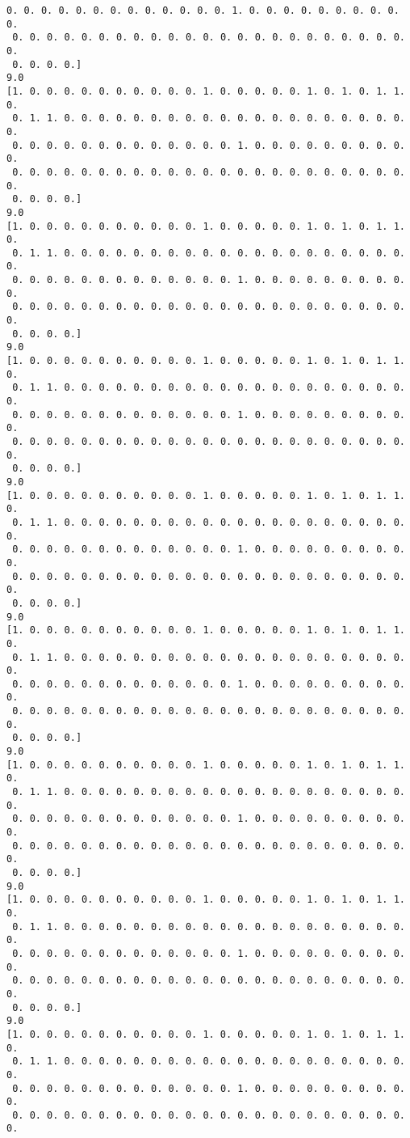 \documentclass[11pt]{article}
\begin{document}
\begin{Verbatim}[commandchars=\\\{\}]
 0. 0. 0. 0. 0. 0. 0. 0. 0. 0. 0. 0. 0. 1. 0. 0. 0. 0. 0. 0. 0. 0. 0. 0.
 0. 0. 0. 0. 0. 0. 0. 0. 0. 0. 0. 0. 0. 0. 0. 0. 0. 0. 0. 0. 0. 0. 0. 0.
 0. 0. 0. 0.]
9.0
[1. 0. 0. 0. 0. 0. 0. 0. 0. 0. 0. 1. 0. 0. 0. 0. 0. 1. 0. 1. 0. 1. 1. 0.
 0. 1. 1. 0. 0. 0. 0. 0. 0. 0. 0. 0. 0. 0. 0. 0. 0. 0. 0. 0. 0. 0. 0. 0.
 0. 0. 0. 0. 0. 0. 0. 0. 0. 0. 0. 0. 0. 1. 0. 0. 0. 0. 0. 0. 0. 0. 0. 0.
 0. 0. 0. 0. 0. 0. 0. 0. 0. 0. 0. 0. 0. 0. 0. 0. 0. 0. 0. 0. 0. 0. 0. 0.
 0. 0. 0. 0.]
9.0
[1. 0. 0. 0. 0. 0. 0. 0. 0. 0. 0. 1. 0. 0. 0. 0. 0. 1. 0. 1. 0. 1. 1. 0.
 0. 1. 1. 0. 0. 0. 0. 0. 0. 0. 0. 0. 0. 0. 0. 0. 0. 0. 0. 0. 0. 0. 0. 0.
 0. 0. 0. 0. 0. 0. 0. 0. 0. 0. 0. 0. 0. 1. 0. 0. 0. 0. 0. 0. 0. 0. 0. 0.
 0. 0. 0. 0. 0. 0. 0. 0. 0. 0. 0. 0. 0. 0. 0. 0. 0. 0. 0. 0. 0. 0. 0. 0.
 0. 0. 0. 0.]
9.0
[1. 0. 0. 0. 0. 0. 0. 0. 0. 0. 0. 1. 0. 0. 0. 0. 0. 1. 0. 1. 0. 1. 1. 0.
 0. 1. 1. 0. 0. 0. 0. 0. 0. 0. 0. 0. 0. 0. 0. 0. 0. 0. 0. 0. 0. 0. 0. 0.
 0. 0. 0. 0. 0. 0. 0. 0. 0. 0. 0. 0. 0. 1. 0. 0. 0. 0. 0. 0. 0. 0. 0. 0.
 0. 0. 0. 0. 0. 0. 0. 0. 0. 0. 0. 0. 0. 0. 0. 0. 0. 0. 0. 0. 0. 0. 0. 0.
 0. 0. 0. 0.]
9.0
[1. 0. 0. 0. 0. 0. 0. 0. 0. 0. 0. 1. 0. 0. 0. 0. 0. 1. 0. 1. 0. 1. 1. 0.
 0. 1. 1. 0. 0. 0. 0. 0. 0. 0. 0. 0. 0. 0. 0. 0. 0. 0. 0. 0. 0. 0. 0. 0.
 0. 0. 0. 0. 0. 0. 0. 0. 0. 0. 0. 0. 0. 1. 0. 0. 0. 0. 0. 0. 0. 0. 0. 0.
 0. 0. 0. 0. 0. 0. 0. 0. 0. 0. 0. 0. 0. 0. 0. 0. 0. 0. 0. 0. 0. 0. 0. 0.
 0. 0. 0. 0.]
9.0
[1. 0. 0. 0. 0. 0. 0. 0. 0. 0. 0. 1. 0. 0. 0. 0. 0. 1. 0. 1. 0. 1. 1. 0.
 0. 1. 1. 0. 0. 0. 0. 0. 0. 0. 0. 0. 0. 0. 0. 0. 0. 0. 0. 0. 0. 0. 0. 0.
 0. 0. 0. 0. 0. 0. 0. 0. 0. 0. 0. 0. 0. 1. 0. 0. 0. 0. 0. 0. 0. 0. 0. 0.
 0. 0. 0. 0. 0. 0. 0. 0. 0. 0. 0. 0. 0. 0. 0. 0. 0. 0. 0. 0. 0. 0. 0. 0.
 0. 0. 0. 0.]
9.0
[1. 0. 0. 0. 0. 0. 0. 0. 0. 0. 0. 1. 0. 0. 0. 0. 0. 1. 0. 1. 0. 1. 1. 0.
 0. 1. 1. 0. 0. 0. 0. 0. 0. 0. 0. 0. 0. 0. 0. 0. 0. 0. 0. 0. 0. 0. 0. 0.
 0. 0. 0. 0. 0. 0. 0. 0. 0. 0. 0. 0. 0. 1. 0. 0. 0. 0. 0. 0. 0. 0. 0. 0.
 0. 0. 0. 0. 0. 0. 0. 0. 0. 0. 0. 0. 0. 0. 0. 0. 0. 0. 0. 0. 0. 0. 0. 0.
 0. 0. 0. 0.]
9.0
[1. 0. 0. 0. 0. 0. 0. 0. 0. 0. 0. 1. 0. 0. 0. 0. 0. 1. 0. 1. 0. 1. 1. 0.
 0. 1. 1. 0. 0. 0. 0. 0. 0. 0. 0. 0. 0. 0. 0. 0. 0. 0. 0. 0. 0. 0. 0. 0.
 0. 0. 0. 0. 0. 0. 0. 0. 0. 0. 0. 0. 0. 1. 0. 0. 0. 0. 0. 0. 0. 0. 0. 0.
 0. 0. 0. 0. 0. 0. 0. 0. 0. 0. 0. 0. 0. 0. 0. 0. 0. 0. 0. 0. 0. 0. 0. 0.
 0. 0. 0. 0.]
9.0
[1. 0. 0. 0. 0. 0. 0. 0. 0. 0. 0. 1. 0. 0. 0. 0. 0. 1. 0. 1. 0. 1. 1. 0.
 0. 1. 1. 0. 0. 0. 0. 0. 0. 0. 0. 0. 0. 0. 0. 0. 0. 0. 0. 0. 0. 0. 0. 0.
 0. 0. 0. 0. 0. 0. 0. 0. 0. 0. 0. 0. 0. 1. 0. 0. 0. 0. 0. 0. 0. 0. 0. 0.
 0. 0. 0. 0. 0. 0. 0. 0. 0. 0. 0. 0. 0. 0. 0. 0. 0. 0. 0. 0. 0. 0. 0. 0.

\end{Verbatim}
\end{document}
